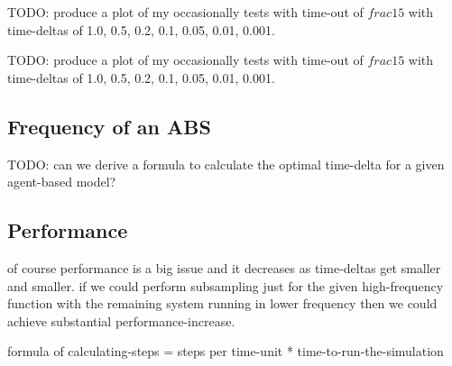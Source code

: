 TODO: produce a plot of my occasionally tests with time-out of $frac{1}{5}$ with time-deltas of 1.0, 0.5, 0.2, 0.1, 0.05, 0.01, 0.001.

TODO: produce a plot of my occasionally tests with time-out of $frac{1}{5}$ with time-deltas of 1.0, 0.5, 0.2, 0.1, 0.05, 0.01, 0.001.

\subsection{Frequency of an ABS}
TODO: can we derive a formula to calculate the optimal time-delta for a given agent-based model?

\subsection{Performance}
of course performance is a big issue and it decreases as time-deltas get smaller and smaller. if we could perform subsampling just for the given high-frequency function with the remaining system running in lower frequency then we could achieve substantial performance-increase.

formula of calculating-steps = steps per time-unit * time-to-run-the-simulation